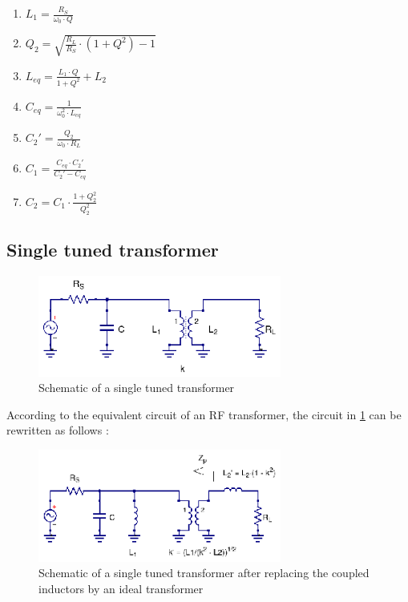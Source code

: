 \begin{enumerate}
  \item $L_1 = \frac{R_S}{\omega_0 \cdot Q}$
  \item $Q_2 = \sqrt{\frac{R_L}{R_S} \cdot (1 + Q^2) - 1 }$
  \item $L_{eq} = \frac{L_1 \cdot Q}{1 + Q^2} + L_2$
  \item $C_{eq} = \frac{1}{\omega_0^2 \cdot L_{eq}}$
  \item $C_2' = \frac{Q_2}{\omega_0 \cdot R_L}$
  \item $C_1 = \frac{C_{eq} \cdot C_2'}{C_2' - C_{eq}}$
  \item $C_2 = C_1 \cdot \frac{1 + Q_2^2}{Q_2^2}$
\end{enumerate}

\subsection{Single tuned transformer}

\begin{figure}[H]
\centering
\includegraphics[width=80mm]{Single-tuned-transformer}
\caption{Schematic of a single tuned transformer}
\label{fig:single-tuned-transformer}
\end{figure}

According to the equivalent circuit of an RF transformer, the circuit in \ref{fig:single-tuned-transformer} can be rewritten as follows \cite{RFMW_amp_osc_Abrie}:


\begin{figure}[H]
\centering
\includegraphics[width=80mm]{Single-tuned-transformer-equivalent-ckt}
\caption{Schematic of a single tuned transformer after replacing the coupled inductors by an ideal transformer}
\label{fig:single-tuned-transformer-equivalent-ckt}
\end{figure}


